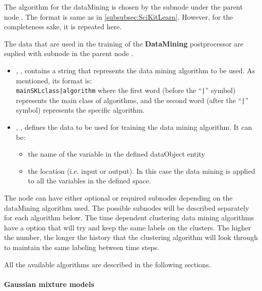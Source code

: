 The algorithm for the dataMining is chosen by the subnode  under the parent node
. The format is same as in \ref{subsubsec:SciKitLearn}. However, for the completeness
sake, it is repeated here.

The data that are used in the training of the \textbf{DataMining}
postprocessor are suplied with subnode  in the parent node
 .


\begin{itemize}
  \item {}, , contains a string that represents the data mining algorithm
  to be used.
  As mentioned, its format is:\\
  \texttt{mainSKLclass|algorithm} where the
  first word (before the ``\texttt{|}'' symbol) represents the main class of
  algorithms, and the second word (after the ``\texttt{|}'' symbol) represents
  the specific algorithm.
  \item {}, , defines the data
  to be used for training the data mining algorithm. It can be:
  \begin{itemize}
	\item the name of the variable in the defined dataObject entity
	\item the location (i.e. input or output). In this case the data mining
        is applied to all the variables in the defined space.
  \end{itemize}
\end{itemize}

The  node can have either optional or required subnodes depending
 on the dataMining algorithm used. The possible subnodes will be described separately
 for each algorithm below. The time dependent clustering data mining algorithms have a  option that will try and keep the same labels on the clusters.  The higher the number, the longer the history that the clustering algorithm will look through to maintain the same labeling between time steps.

All the available algorithms are described in the following sections.

\paragraph{Gaussian mixture models}
\label{paragraph:GMM}

